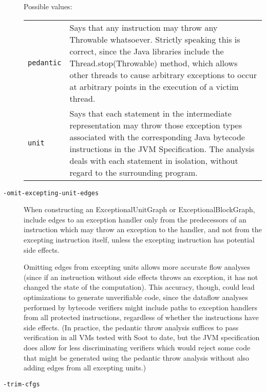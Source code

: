 \documentclass{article}
\begin{document}
\begin{description}
Possible values:\\
\begin{longtable}{p{1in}p{4in}}
{\tt pedantic} 
&

Says that any instruction may throw any
Throwable whatsoever. Strictly speaking this is
correct, since the Java libraries include the
Thread.stop(Throwable)
method, which allows other threads to cause arbitrary exceptions
to occur at arbitrary points in the execution of a victim thread.
\\
{\tt unit} 
&

Says that each statement in the intermediate representation
may throw those exception types associated with the corresponding
Java bytecode instructions in the JVM Specification.  The
analysis deals with each statement in isolation, without regard
to the surrounding program.
\\

\end{longtable}


  \item[
  {\tt -omit-excepting-unit-edges}]


\par

When constructing an ExceptionalUnitGraph or
ExceptionalBlockGraph, include edges to an exception
handler only from the predecessors of an instruction which may
throw an exception to the handler, and not from the excepting
instruction itself, unless the excepting instruction has
potential side effects.



\par

Omitting edges from excepting units allows more accurate flow
analyses (since if an instruction without side effects throws an
exception, it has not changed the state of the computation). This
accuracy, though, could lead optimizations to generate
unverifiable code, since the dataflow analyses performed by
bytecode verifiers might include paths to exception handlers from
all protected instructions, regardless of whether the
instructions have side effects.  (In practice, the pedantic throw
analysis suffices to pass verification in all VMs tested with
Soot to date, but the JVM specification does allow for less
discriminating verifiers which would reject some code that might
be generated using the pedantic throw analysis without also
adding edges from all excepting units.)



  \item[
  {\tt -trim-cfgs}]



\end{description}
\end{document}

